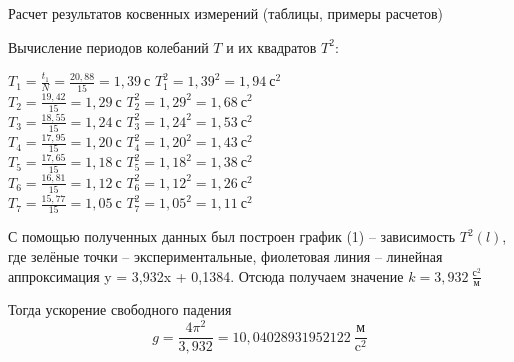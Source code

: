 \documentclass[12pt]{article}
\begin{document}
    \begin{point}{Расчет результатов косвенных измерений (таблицы, примеры расчетов)}
        \par Вычисление периодов колебаний $T$ и их квадратов $T^2$: \\
        \begin{center}
            \( T_1 = \frac{t_1}{N} = \frac{20,88}{15} = 1,39 \ \text{с} \) \quad \( T^2_1 = 1,39^2 = 1,94 \ \text{с}^2 \) \\
            \vspace{1mm}
            \( T_2 = \frac{19,42}{15} = 1,29 \ \text{с} \) \quad \qquad \( T^2_2 = 1,29^2 = 1,68 \ \text{с}^2 \) \\
            \vspace{1mm}
            \( T_3 = \frac{18,55}{15} = 1,24 \ \text{с} \) \quad \qquad \( T^2_3 = 1,24^2 = 1,53 \ \text{с}^2 \) \\
            \vspace{1mm}
            \( T_4 = \frac{17,95}{15} = 1,20 \ \text{с} \) \quad \qquad \( T^2_4 = 1,20^2 = 1,43 \ \text{с}^2 \) \\
            \vspace{1mm}
            \( T_5 = \frac{17,65}{15} = 1,18 \ \text{с} \) \quad \qquad \( T^2_5 = 1,18^2 = 1,38 \ \text{с}^2 \) \\
            \vspace{1mm}
            \( T_6 = \frac{16,81}{15} = 1,12 \ \text{с} \) \quad \qquad \( T^2_6 = 1,12^2 = 1,26 \ \text{с}^2 \) \\
            \vspace{1mm}
            \( T_7 = \frac{15,77}{15} = 1,05 \ \text{с} \) \quad \qquad \( T^2_7 = 1,05^2 = 1,11 \ \text{с}^2 \)
        \end{center}
        \par С помощью полученных данных был построен график (1) -- зависимость $T^2(l)$, где зелёные точки -- экспериментальные, фиолетовая линия -- линейная аппроксимация y = 3,932x + 0,1384. Отсюда получаем значение $k = 3,932 \ \frac{\text{с}^2}{\text{м}}$
        \par Тогда ускорение свободного падения
        \[ g = \frac{4{\pi}^2}{3,932} = 10,04028931952122 \ \frac{\text{м}}{\text{c}^2} \]
    \end{point}
    
\end{document}
